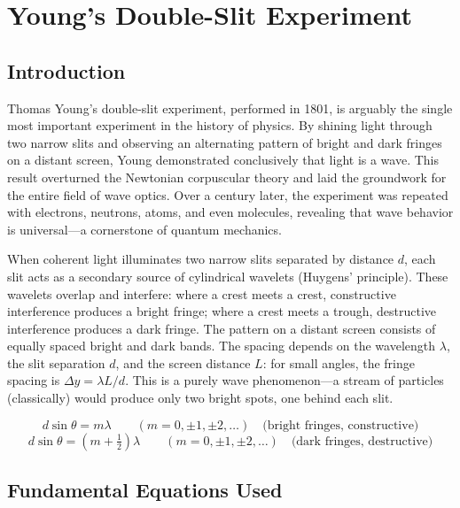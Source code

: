 \chapter{Young's Double-Slit Experiment}

\section*{Introduction}

Thomas Young's double-slit experiment, performed in 1801, is arguably the single most important experiment in the history of physics. By shining light through two narrow slits and observing an alternating pattern of bright and dark fringes on a distant screen, Young demonstrated conclusively that light is a wave. This result overturned the Newtonian corpuscular theory and laid the groundwork for the entire field of wave optics. Over a century later, the experiment was repeated with electrons, neutrons, atoms, and even molecules, revealing that wave behavior is universal---a cornerstone of quantum mechanics.

When coherent light illuminates two narrow slits separated by distance $d$, each slit acts as a secondary source of cylindrical wavelets (Huygens' principle). These wavelets overlap and interfere: where a crest meets a crest, constructive interference produces a bright fringe; where a crest meets a trough, destructive interference produces a dark fringe. The pattern on a distant screen consists of equally spaced bright and dark bands. The spacing depends on the wavelength $\lambda$, the slit separation $d$, and the screen distance $L$: for small angles, the fringe spacing is $\Delta y = \lambda L/d$. This is a purely wave phenomenon---a stream of particles (classically) would produce only two bright spots, one behind each slit.


\begin{equation}
d\sin\theta = m\lambda \qquad (m = 0, \pm 1, \pm 2, \ldots) \quad \text{(bright fringes, constructive)}
\end{equation}
\begin{equation}
d\sin\theta = \left(m + \tfrac{1}{2}\right)\lambda \qquad (m = 0, \pm 1, \pm 2, \ldots) \quad \text{(dark fringes, destructive)}
\end{equation}

\section*{Fundamental Equations Used}


